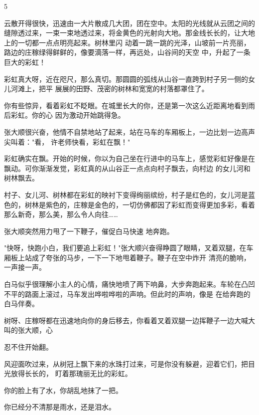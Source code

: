 \documentclass{article}
\begin{document}
5 

云散开得很快，迅速由一大片散成几大团，团在空中。太阳的光线就从云团之间的缝隙透过来，一束一束地透过来，将金黄色的光射向大地。那金线长长的，让大地上的一切都一点点明亮起来。树林里闪
\newpage
动着一跳一跳的光泽，山坡前一片亮丽，路边的庄稼绿得鲜鲜的，像要滴落一样，再远处，山谷间的天空
中，升起了一条巨大的彩虹！ 

彩虹真大呀，近在咫尺，那么真切。那圆圆的弧线从山谷一直跨到村子另一侧的女儿河滩上，把平
展展的田野、茂密的树林和宽宽的村落都罩住了。 

你有些惊异，看着彩虹不眨眼。在城里长大的你，还是第一次这么近距离地看到雨后彩虹。你的心
因为激动开始跳得急。 

张大顺很兴奋，他情不自禁地站了起来，站在马车的车厢板上，一边比划一边高声尖叫着："看，
许老师快看，彩虹在飘！" 

彩虹确实在飘。开始的时候，你以为自己坐在行进中的马车上，感觉彩虹好像是在飘动。可你渐渐发觉，彩虹真的从山谷正一点点向村子飘去，向村边
的女儿河和树林飘去。 

\newpage

村子、女儿河、树林都在彩虹的映衬下变得绚丽缤纷，村子是红色的，女儿河是蓝色的，树林是紫色的，庄稼是金色的，一切仿佛都因了彩虹而变得更加多彩，看着那么新奇，那么美，那么令人向往……

张大顺突然用力甩了一下鞭子，催促白马快速
地奔跑。 

"快呀，快跑小白，我们要追上彩虹！"张大顺兴奋得睁圆了眼睛，叉着双腿，在车厢板上站成了夸张的马步，一下一下地甩着鞭子。鞭子在空中炸开
清亮的脆响，一声接一声。 

白马似乎很理解小主人的心情，痛快地喷了两下响鼻，大步奔跑起来。车轮在凸凹不平的路面上滚过，马车发出哗啦哗啦的声响。但此时的声响，像是
在给奔跑的白马伴奏。 

树呀、庄稼呀都在迅速地向你的身后移去，你看着叉着双腿一边挥鞭子一边大喊大叫的张大顺，心

\newpage
忍不住开始翻。 

风迎面吹过来，从树冠上飘下来的水珠打过来，可是你没有躲避，迎着它们，把目光放得长长的，
盯着那瑰丽无比的彩虹。 


你的脸上有了水，你胡乱地抹了一把。 

你已经分不清那是雨水，还是泪水。
\end{document}
